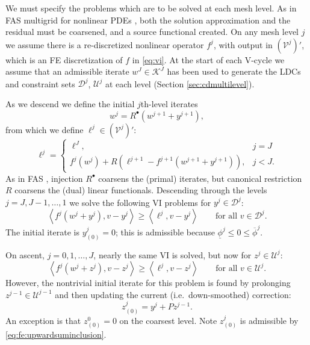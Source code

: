 \documentclass[review,hidelinks,onefignum,onetabnum,final]{siamart220329}  %
\newcommand{\cV}{\mathcal{V}}
\newcommand{\ip}[2]{\left<#1,#2\right>}
\newcommand{\iR}{R^{\bullet}}
\begin{document}
We must specify the problems which are to be solved at each mesh level.  As in FAS multigrid for nonlinear PDEs \cite{BrandtLivne2011,Bruneetal2015,Trottenbergetal2001}, both the solution approximation and the residual must be coarsened, and a source functional created.  On any mesh level $j$ we assume there is a re-discretized nonlinear operator $f^j$, with output in $(\cV^j)'$, which is an FE discretization of $f$ in \eqref{eq:vi}.  At the start of each V-cycle we assume that an admissible iterate $w^J \in \mathcal{K}^J$ has been used to generate the LDCs and constraint sets $\mathcal{D}^j$, $\mathcal{U}^j$ at each level (Section \ref{sec:cdmultilevel}).

As we descend we define the initial $j$th-level iterates
\begin{equation}
w^j = \iR(w^{j+1} + y^{j+1}),  \label{eq:fe:definew}
\end{equation}
from which we define $\ell^j \in (\cV^j)'$:
\begin{equation}
\ell^j = \begin{cases} \ell^J, & j=J \\
                       f^j(w^j) + R\left(\ell^{j+1}-f^{j+1}(w^{j+1}+y^{j+1})\right), & j<J. \end{cases} \label{eq:fe:levelsource}
\end{equation}
As in FAS \cite[section 5.3]{Trottenbergetal2001}, injection $\iR$ coarsens the (primal) iterates, but canonical restriction $R$ coarsens the (dual) linear functionals.  Descending through the levels $j=J,J-1,\dots,1$ we solve the following VI problems for $y^j \in \mathcal{D}^j$:
\begin{equation}
\ip{f^j(w^j + y^j)}{v-y^j} \ge \ip{\ell^j}{v-y^j} \qquad \text{for all } v\in \mathcal{D}^j. \label{eq:fe:downvi}
\end{equation}
The initial iterate is $y_{(0)}^j=0$; this is admissible because $\underline{\phi}^j \le 0 \le \overline{\phi}^j$.

On ascent, $j=0,1,\dots,J$, nearly the same VI is solved, but now for $z^j \in \mathcal{U}^j$:
\begin{equation}
\ip{f^j(w^j + z^j)}{v-z^j} \ge \ip{\ell^j}{v-z^j} \qquad \text{for all } v\in \mathcal{U}^j. \label{eq:fe:upvi}
\end{equation}
However, the nontrivial initial iterate for this problem is found by prolonging $z^{j-1} \in \mathcal{U}^{j-1}$ and then updating the current (i.e.~down-smoothed) correction:
\begin{equation}
z_{(0)}^j = y^j + P z^{j-1}.  \label{eq:fe:upwardinitial}
\end{equation}
An exception is that $z_{(0)}^0=0$ on the coarsest level.  Note $z_{(0)}^j$ is admissible by \eqref{eq:fe:upwardsuminclusion}.
\end{document}
